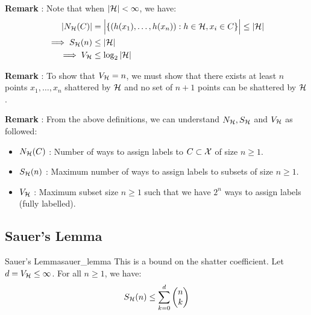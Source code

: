 \noindent\textbf{Remark} : Note that when $|\mathcal{H}| < \infty$, we have:
\begin{align*}
    |N_{\mathcal{H}}(C)| &= \Big| 
        \{(h(x_1), \dots, h(x_n)) : h\in\mathcal{H}, x_i \in C\}
     \Big| \le |\mathcal{H}| \\
    \implies S_{\mathcal{H}}(n) &\le |\mathcal{H}| \\
    \implies V_{\mathcal{H}} &\le \log_2|\mathcal{H}|
\end{align*}


\noindent \textbf{Remark} : To show that $V_{\mathcal{H}}=n$, we must show that there exists at least $n$ points $x_1, \dots, x_n$ shattered by $\mathcal{H}$ and no set of $n+1$ points can be shattered by $\mathcal{H}$. 

\noindent\newline \textbf{Remark} : From the above definitions, we can understand $N_{\mathcal{H}}, S_{\mathcal{H}}$ and $V_{\mathcal{H}}$ as followed:
\begin{itemize}
    \item $N_{\mathcal{H}}(C)$ : Number of ways to assign labels to $C\subset \mathcal{X}$ of size $n\ge1$.
    \item $S_{\mathcal{H}}(n)$ : Maximum number of ways to assign labels to subsets of size $n\ge1$.
    \item $V_{\mathcal{H}}$ : Maximum subset size $n\ge1$ such that we have $2^n$ ways to assign labels (fully labelled).
\end{itemize}


\subsection{Sauer's Lemma}
\begin{theorem}{Sauer's Lemma}{sauer_lemma}
    This is a bound on the shatter coefficient. Let $d=V_{\mathcal{H}}\le\infty$. For all $n\ge1$, we have:
    \begin{align*}
        S_{\mathcal{H}}(n) \le \sum_{k = 0}^d \begin{pmatrix}
            n \\ k
        \end{pmatrix}
    \end{align*}
\end{theorem}

